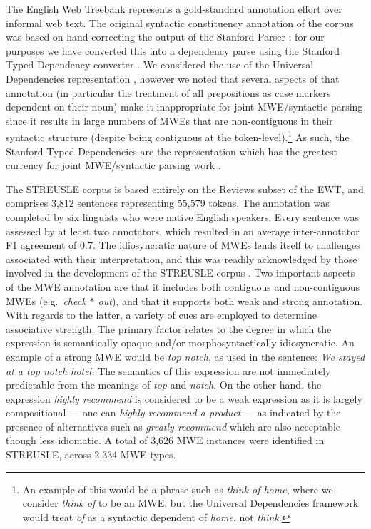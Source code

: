 \documentclass[output=paper
,modfonts
,nonflat]{langsci/langscibook}
\newcommand{\lex}[1]{\textit{#1}\xspace}
\newcommand{\gap}{$*$\xspace}
\begin{document}
The English Web Treebank \citep{EWT} represents a gold-standard annotation effort over informal web text. The original syntactic constituency annotation of the corpus was based on hand-correcting the output of the Stanford Parser \citep{Manning+:2014}; for our purposes we have converted this into a dependency parse using the Stanford Typed Dependency converter \citep{StanfordDep}. We considered the use of the Universal Dependencies representation \citep{nivre2016universal}, however we noted that several aspects of that annotation (in particular the treatment of all prepositions as case markers dependent on their noun) make it inappropriate for joint MWE/syntactic parsing since it results in large numbers of MWEs that are non-contiguous in their syntactic structure (despite being contiguous at the token-level).\footnote{An example of this would be a phrase such as \lex{think of home}, where we consider \lex{think of} to be an MWE, but the Universal Dependencies framework would treat \lex{of} as a syntactic dependent of \lex{home}, not \lex{think}.} As such, the Stanford Typed Dependencies are the representation which has the greatest currency for joint MWE/syntactic parsing work \citep{Constant16}. 

The STREUSLE corpus \citep{Schneider14} is based entirely on the Reviews subset of the EWT, and comprises 3,812 sentences representing 55,579 tokens. The annotation was completed by six linguists who were native English speakers. Every sentence was assessed by at least two annotators, which resulted in an average inter-annotator F1 agreement of 0.7. The idiosyncratic nature of MWEs lends itself to challenges associated with their interpretation, and this was readily acknowledged by those involved in the development of the STREUSLE corpus \citep{Hollenstein16}. Two important aspects of the MWE annotation are that it includes both contiguous and non-contiguous MWEs (e.g.\ \lex{check \gap out}), and that it supports both weak and strong annotation. With regards to the latter, a variety of cues are employed to determine associative strength. The primary factor relates to the degree in which the expression is semantically opaque and/or morphosyntactically idiosyncratic. An example of a strong MWE would be \lex{top notch}, as used in the sentence: \lex{We stayed at a top notch hotel.} The semantics of this expression are not immediately predictable from the meanings of \lex{top} and \lex{notch}. On the other hand, the expression \lex{highly recommend} is considered to be a weak expression as it is largely compositional --- one can \lex{highly recommend a product} --- as indicated by the presence of alternatives such as \lex{greatly recommend} which are also acceptable though less idiomatic. A total of 3,626 MWE instances were identified in STREUSLE, across 2,334 MWE types.
\end{document}
